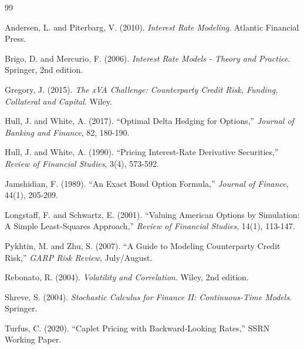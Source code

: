 \documentclass[conference]{IEEEtran}
\theoremstyle{definition}
\begin{document}
\begin{thebibliography}{99}

Andersen, L. and Piterbarg, V. (2010). \textit{Interest Rate Modeling}. Atlantic Financial Press.

Brigo, D. and Mercurio, F. (2006). \textit{Interest Rate Models - Theory and Practice}. Springer, 2nd edition.

Gregory, J. (2015). \textit{The xVA Challenge: Counterparty Credit Risk, Funding, Collateral and Capital}. Wiley.

Hull, J. and White, A. (2017). ``Optimal Delta Hedging for Options,'' \textit{Journal of Banking and Finance}, 82, 180-190.

Hull, J. and White, A. (1990). ``Pricing Interest-Rate Derivative Securities,'' \textit{Review of Financial Studies}, 3(4), 573-592.

Jamshidian, F. (1989). ``An Exact Bond Option Formula,'' \textit{Journal of Finance}, 44(1), 205-209.

Longstaff, F. and Schwartz, E. (2001). ``Valuing American Options by Simulation: A Simple Least-Squares Approach,'' \textit{Review of Financial Studies}, 14(1), 113-147.

Pykhtin, M. and Zhu, S. (2007). ``A Guide to Modeling Counterparty Credit Risk,'' \textit{GARP Risk Review}, July/August.

Rebonato, R. (2004). \textit{Volatility and Correlation}. Wiley, 2nd edition.

Shreve, S. (2004). \textit{Stochastic Calculus for Finance II: Continuous-Time Models}. Springer.

Turfus, C. (2020). ``Caplet Pricing with Backward-Looking Rates,'' SSRN Working Paper.

\end{thebibliography}
\end{document}
